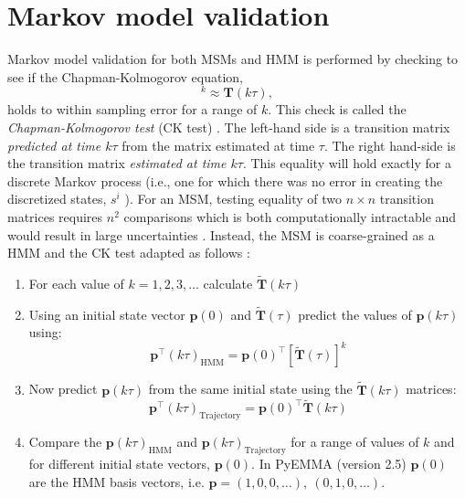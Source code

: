 \section{Markov model validation}\label{sec:model_validation}
Markov model validation for both MSMs and HMM is performed by checking to see if the Chapman-Kolmogorov equation,
\begin{equation}
[\mathbf{T}(\tau)]^{k} \approx \mathbf{T}(k \tau),
\end{equation}
holds to within sampling error for a range of $k$. This check is called the \emph{Chapman-Kolmogorov test} (CK test) \cite{prinzMarkovModelsMolecular2011}.  The left-hand side is a transition matrix \emph{predicted at time $k\tau$} from the matrix estimated at time $\tau$. The right hand-side is the transition matrix \emph{estimated at time $k\tau$}. This equality will hold exactly for a discrete Markov process (i.e., one for which there was no error in creating the discretized states, $s^i$ \cite{prinzMarkovModelsMolecular2011}). For an MSM, testing equality of two $n \times n$ transition matrices requires $n^{2}$ comparisons which is both computationally intractable and would result in large uncertainties \cite{prinzMarkovModelsMolecular2011}. Instead, the MSM is coarse-grained as a HMM and the CK test adapted as follows \cite{prinzMarkovModelsMolecular2011}:
\begin{enumerate}
    \item For each value of $k = 1, 2, 3, \ldots$ calculate $\widetilde{\mathbf{T}}(
    k\tau)$
    \item Using an initial state vector $\mathbf{p}(0)$ and $\widetilde{\mathbf{T}}(\tau)$ predict the values of $\mathbf{p}(k\tau)$ using: 
    \begin{equation*}
        \mathbf{p}^{\top}(k\tau)_{\mathrm{HMM}} = \mathbf{p}(0)^{\top}[\widetilde{\mathbf{T}}(\tau)]^{k}
    \end{equation*}
    \item Now predict $\mathbf{p}(k\tau)$ from the same initial state using the  $\widetilde{\mathbf{T}}(k\tau)$ matrices: 
    \begin{equation*}
        \mathbf{p}^{\top}(k\tau)_{\mathrm{Trajectory}} = \mathbf{p}(0)^{\top}\widetilde{\mathbf{T}}(k\tau)
    \end{equation*}
    \item Compare the $\mathbf{p}(k\tau)_{\mathrm{HMM}}$ and $\mathbf{p}(k\tau)_{\mathrm{Trajectory}}$ for a range of values of $k$ and for different initial state vectors, $\mathbf{p}(0)$. In PyEMMA (version 2.5) \cite{schererPyEMMASoftwarePackage2015a} $\mathbf{p}(0)$ are the HMM basis vectors, i.e. $\mathbf{p} = (1, 0, 0, \ldots),\ (0, 1, 0, \ldots)$. 
\end{enumerate}


